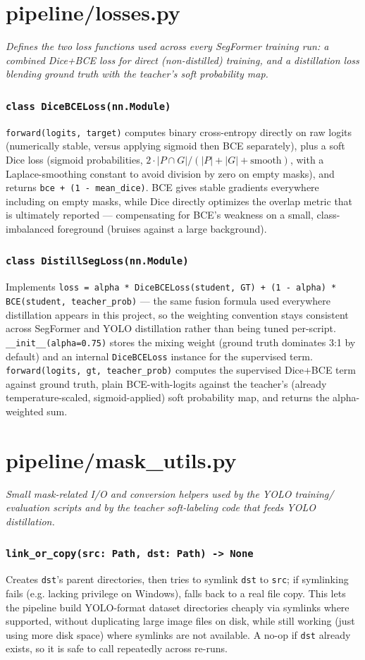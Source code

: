 \documentclass[11pt]{article}
\newcommand{\role}[1]{\par\noindent\textit{#1}\par\vspace{0.5em}}
\newcommand{\func}[1]{\subsubsection*{\texttt{#1}}}
\begin{document}
\newpage
\section{pipeline/losses.py}
\role{Defines the two loss functions used across every SegFormer training run: a
combined Dice+BCE loss for direct (non-distilled) training, and a distillation
loss blending ground truth with the teacher's soft probability map.}

\func{class DiceBCELoss(nn.Module)}
\texttt{forward(logits, target)} computes binary cross-entropy directly on raw
logits (numerically stable, versus applying sigmoid then BCE separately), plus
a soft Dice loss (sigmoid probabilities, $2 \cdot |P \cap G| / (|P| + |G| +
\text{smooth})$, with a Laplace-smoothing constant to avoid division by zero on
empty masks), and returns \texttt{bce + (1 - mean\_dice)}. BCE gives stable
gradients everywhere including on empty masks, while Dice directly optimizes the
overlap metric that is ultimately reported --- compensating for BCE's weakness
on a small, class-imbalanced foreground (bruises against a large background).

\func{class DistillSegLoss(nn.Module)}
Implements \texttt{loss = alpha * DiceBCELoss(student, GT) + (1 - alpha) *
BCE(student, teacher\_prob)} --- the same fusion formula used everywhere
distillation appears in this project, so the weighting convention stays
consistent across SegFormer and YOLO distillation rather than being tuned
per-script. \texttt{\_\_init\_\_(alpha=0.75)} stores the mixing weight (ground
truth dominates 3:1 by default) and an internal \texttt{DiceBCELoss} instance
for the supervised term. \texttt{forward(logits, gt, teacher\_prob)} computes the
supervised Dice+BCE term against ground truth, plain BCE-with-logits against the
teacher's (already temperature-scaled, sigmoid-applied) soft probability map,
and returns the alpha-weighted sum.

\newpage
\section{pipeline/mask\_utils.py}
\role{Small mask-related I/O and conversion helpers used by the YOLO training/
evaluation scripts and by the teacher soft-labeling code that feeds YOLO
distillation.}

\func{link\_or\_copy(src: Path, dst: Path) -> None}
Creates \texttt{dst}'s parent directories, then tries to symlink \texttt{dst} to
\texttt{src}; if symlinking fails (e.g. lacking privilege on Windows), falls
back to a real file copy. This lets the pipeline build YOLO-format dataset
directories cheaply via symlinks where supported, without duplicating large
image files on disk, while still working (just using more disk space) where
symlinks are not available. A no-op if \texttt{dst} already exists, so it is
safe to call repeatedly across re-runs.
\end{document}
